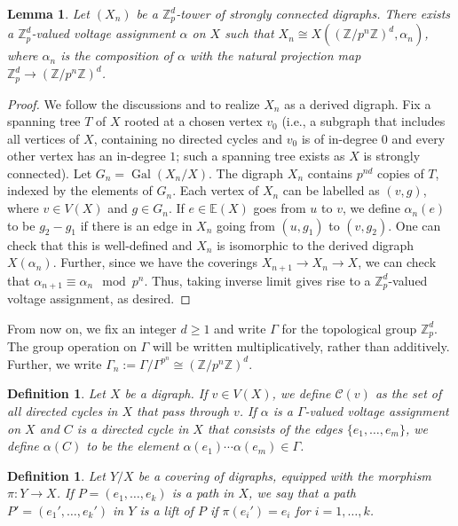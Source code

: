 \documentclass[11pt]{amsart}
\DeclareMathOperator{\Gal}{Gal}
\newtheorem{lemma}[theorem]{Lemma}
\newtheorem{defn}[theorem]{Definition}
\numberwithin{equation}{section}
\theoremstyle{remark}
\newcommand{\EE}{\mathbb{E}}
\newcommand{\?}{\stackrel{?}{=}}
\newcommand{\ZZ}{\mathbb{Z}}
\newcommand{\Zp}{\mathbb{Z}_p}
\newcommand{\cC}{\mathcal{C}}
\begin{document}
\begin{lemma}\label{lem:voltage}
Let $(X_n)$ be a $\Zp^d$-tower of strongly connected digraphs. There exists a $\Zp^d$-valued voltage assignment $\alpha$ on $X$ such that $X_n\cong X((\ZZ/p^n\ZZ)^d,\alpha_n)$, where $\alpha_n$ is the composition of $\alpha$ with the natural projection map $\Zp^d\to (\ZZ/p^n\ZZ)^d$.
\end{lemma}
\begin{proof}
    We follow the discussions \cite[\S2.4]{gonet-thesis} and \cite[\S13-14]{terras} to realize $X_n$ as a derived digraph. Fix a spanning tree $T$ of $X$ rooted at a chosen vertex $v_0$ (i.e., a subgraph that includes all vertices of $X$, containing no directed cycles and $v_0$ is of in-degree $0$ and every other vertex has an in-degree $1$; such a spanning tree exists as $X$ is strongly connected). Let $G_n=\Gal(X_n/X)$. The digraph $X_n$ contains $p^{nd}$ copies of $T$, indexed by the elements of $G_n$. Each vertex of $X_n$ can be labelled as $(v,g)$, where $v\in V(X)$ and $g\in G_n$. If $e\in\EE(X)$ goes from $u$ to $v$, we define $\alpha_n(e)$ to be $g_2-g_1$ if there is an edge in $X_n$ going from $(u,g_1)$ to $(v,g_2)$. One can check that this is well-defined and $X_n$ is isomorphic to the derived digraph $X(\alpha_n)$. Further, since we have the coverings $X_{n+1}\to X_n\to X$, we can check that $\alpha_{n+1}\equiv \alpha_n\mod p^n$. Thus, taking inverse limit gives rise to a $\Zp^d$-valued voltage assignment, as desired.
\end{proof}


From now on, we fix an integer $d\ge1$ and write $\Gamma$ for the topological group $\Zp^d$. The group operation on $\Gamma$ will be written multiplicatively, rather than additively. Further, we write $\Gamma_n:=\Gamma/\Gamma^{p^n}\cong (\ZZ/p^n\ZZ)^d$.




\begin{defn}
Let $X$ be a digraph. If $v\in V(X)$, we define $\cC(v)$ as the set of all directed cycles in $X$ that pass through $v$. If $\alpha$ is a $\Gamma$-valued voltage assignment on $X$ and $C$ is a directed cycle in $X$ that consists of the edges $\{e_1,\ldots,e_m\}$, we define $\alpha(C)$ to be the element $\alpha(e_1)\cdots\alpha(e_m)\in\Gamma$.    
\end{defn}

\begin{defn}
Let $Y/X$ be a covering of digraphs, equipped with the morphism $\pi:Y\to X$. If $P=(e_1,\dots,e_k)$ is a path in $X$, we say that a path $P'=(e_1',\dots, e_k')$ in $Y$ is a lift of $P$ if $\pi(e_i')=e_i$ for $i=1,\dots,k$.
\end{defn}
\end{document}
